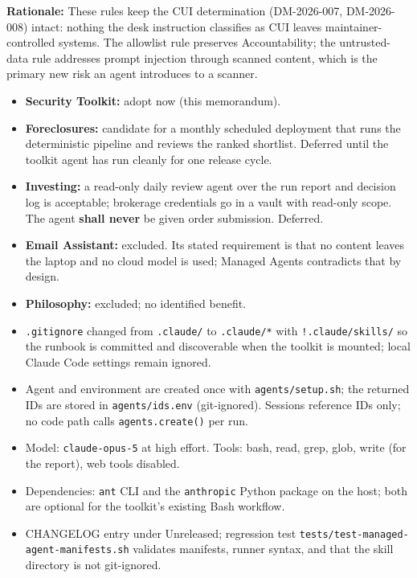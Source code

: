 {\begin{enumerate}
\textbf{Rationale:} These rules keep the CUI determination (DM-2026-007,
DM-2026-008) intact: nothing the desk instruction classifies as CUI leaves
maintainer-controlled systems. The allowlist rule preserves Accountability;
the untrusted-data rule addresses prompt injection through scanned content,
which is the primary new risk an agent introduces to a scanner.


\begin{itemize}
    \item \textbf{Security Toolkit:} adopt now (this memorandum).
    \item \textbf{Foreclosures:} candidate for a monthly scheduled deployment that
    runs the deterministic pipeline and reviews the ranked shortlist. Deferred
    until the toolkit agent has run cleanly for one release cycle.
    \item \textbf{Investing:} a read-only daily review agent over the run report and
    decision log is acceptable; brokerage credentials go in a vault with
    read-only scope. The agent \textbf{shall never} be given order submission.
    Deferred.
    \item \textbf{Email Assistant:} excluded. Its stated requirement is that no
    content leaves the laptop and no cloud model is used; Managed Agents
    contradicts that by design.
    \item \textbf{Philosophy:} excluded; no identified benefit.
\end{itemize}


\begin{itemize}
    \item \texttt{.gitignore} changed from \texttt{.claude/} to
    \texttt{.claude/*} with \texttt{!.claude/skills/} so the runbook is committed
    and discoverable when the toolkit is mounted; local Claude Code settings
    remain ignored.
    \item Agent and environment are created once with \texttt{agents/setup.sh};
    the returned IDs are stored in \texttt{agents/ids.env} (git-ignored). Sessions
    reference IDs only; no code path calls \texttt{agents.create()} per run.
    \item Model: \texttt{claude-opus-5} at high effort. Tools: bash, read, grep,
    glob, write (for the report), web tools disabled.
    \item Dependencies: \texttt{ant} CLI and the \texttt{anthropic} Python package
    on the host; both are optional for the toolkit's existing Bash workflow.
    \item CHANGELOG entry under Unreleased; regression test
    \texttt{tests/test-managed-agent-manifests.sh} validates manifests, runner
    syntax, and that the skill directory is not git-ignored.
\end{itemize}


\end{enumerate}}
